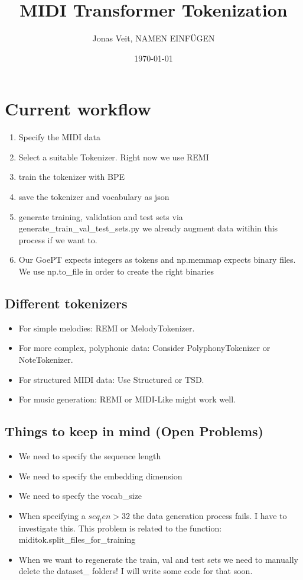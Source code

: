 \documentclass{article}
\title{MIDI Transformer Tokenization}
\author{Jonas Veit, NAMEN EINFÜGEN }
\date{\today}
\begin{document}
    \maketitle
    \section*{Current workflow}
    \begin{enumerate}
        \item Specify the MIDI data
        \item Select a suitable Tokenizer. Right now we use REMI
        \item train the tokenizer with BPE
        \item save the tokenizer and vocabulary as json
        \item generate training, validation and test sets via generate\_train\_val\_test\_sets.py we already augment data witihin this process if we want to.
        \item Our GoePT expects integers as tokens and np.memmap expects binary files. We use np.to\_file in order to create the right binaries
    \end{enumerate}
    
    \subsection*{Different tokenizers}
    \begin{itemize}
        \item For simple melodies: REMI or MelodyTokenizer.
        \item For more complex, polyphonic data: Consider PolyphonyTokenizer or NoteTokenizer.
        \item For structured MIDI data: Use Structured or TSD.
        \item For music generation: REMI or MIDI-Like might work well.
    \end{itemize}

    \subsection*{Things to keep in mind (Open Problems)}
    \begin{itemize}
        \item We need to specify the sequence length
        \item We need to specify the embedding dimension
        \item We need to specfy the vocab\_size
        \item When specifying a $seq_len > 32$ the data generation process fails. I have to investigate this. This problem is related to the function: miditok.split\_files\_for\_training
        \item When we want to regenerate the train, val and test sets we need to manually delete the dataset\_ folders! I will write some code for that soon.
    \end{itemize}
\end{document}

